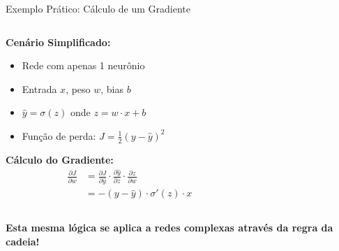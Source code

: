 \documentclass[xcolor=dvipsnames,t,aspectratio=169]{beamer}
\begin{document}
\begin{frame}[c]{Exemplo Prático: Cálculo de um Gradiente}
    \begin{columns}[c]
        \begin{column}{0.5\textwidth}
            \textbf{Cenário Simplificado:}
            \begin{itemize}
                \item Rede com apenas 1 neurônio
                \item Entrada $x$, peso $w$, bias $b$
                \item $\hat{y} = \sigma(z)$ onde $z = w \cdot x + b$
                \item Função de perda: $J = \frac{1}{2}(y - \hat{y})^2$
            \end{itemize}
            
            \vspace{0.5cm}
            \textbf{Cálculo do Gradiente:}
            \footnotesize
            \begin{align*}
                \frac{\partial J}{\partial w} &= \frac{\partial J}{\partial \hat{y}} \cdot \frac{\partial \hat{y}}{\partial z} \cdot \frac{\partial z}{\partial w} \\
                &= - (y - \hat{y}) \cdot \sigma'(z) \cdot x
            \end{align*}
        \end{column}
        \begin{column}{0.5\textwidth}
        \end{column}
    \end{columns}
    
    \vspace{0.5cm}
    \begin{center}
        \textbf{Esta mesma lógica se aplica a redes complexas através da regra da cadeia!}
    \end{center}
\end{frame}
\end{document}
